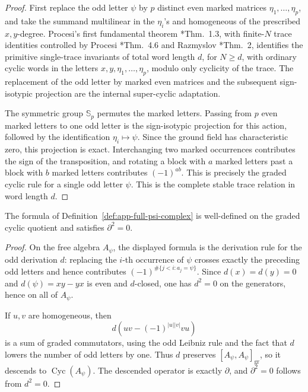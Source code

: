 \begin{proof}
  First replace the odd letter \(\psi\) by \(p\) distinct even marked
  matrices \(\eta_1,\ldots,\eta_p\), and take the summand multilinear in the
  \(\eta_i\)'s and homogeneous of the prescribed \(x,y\)-degree.
  Procesi's first fundamental theorem \cite{procesi}*{Thm.~1.3},
  with finite-\(N\) trace identities controlled by Procesi
  \cite{procesi}*{Thm.~4.6} and Razmyslov \cite{razmyslov}*{Thm.~2},
  identifies the primitive single-trace invariants of total word length
  \(d\), for \(N\geq d\), with ordinary cyclic words in the letters
  \(x,y,\eta_1,\ldots,\eta_p\), modulo only cyclicity of the trace.  The
  replacement of the odd letter by marked even matrices and the subsequent
  sign-isotypic projection are the internal super-cyclic adaptation.

  The symmetric group \(\mathbb S_p\) permutes the marked letters.  Passing
  from \(p\) even marked letters to one odd letter is the sign-isotypic
  projection for this action, followed by the identification
  \(\eta_i\mapsto\psi\).  Since the ground field has characteristic zero, this
  projection is exact.  Interchanging two marked occurrences contributes the
  sign of the transposition, and rotating a block with \(a\) marked letters
  past a block with \(b\) marked letters contributes \((-1)^{ab}\).  This is
  precisely the graded cyclic rule for a single odd letter \(\psi\).  This
  is the complete stable trace relation in word length \(d\).
\end{proof}

\begin{lem}[Boundary signs and \(\partial^2=0\)]
\label{lem:app-full-boundary-d2}
  The formula of Definition~\ref{def:app-full-psi-complex} is well-defined on
  the graded cyclic quotient and satisfies \(\partial^2=0\).
\end{lem}

\begin{proof}
  On the free algebra \(A_\psi\), the displayed formula is the derivation
  rule for the odd derivation \(d\): replacing the \(i\)-th occurrence of
  \(\psi\) crosses exactly the preceding odd letters and hence contributes
  \((-1)^{\#\{j<i:a_j=\psi\}}\).  Since \(d(x)=d(y)=0\) and
  \(d(\psi)=xy-yx\) is even and \(d\)-closed, one has \(d^2=0\) on the
  generators, hence on all of \(A_\psi\).

  If \(u,v\) are homogeneous, then
  \[
    d(uv-(-1)^{|u||v|}vu)
  \]
  is a sum of graded commutators, using the odd Leibniz rule and the fact that
  \(d\) lowers the number of odd letters by one.  Thus \(d\) preserves
  \([A_\psi,A_\psi]_{\mathrm{gr}}\), so it descends to
  \(\operatorname{Cyc}(A_\psi)\).  The descended operator is exactly
  \(\partial\), and \(\partial^2=0\) follows from \(d^2=0\).
\end{proof}

